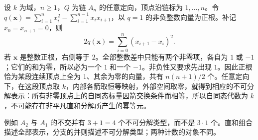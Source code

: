 \begin{example}\label{b5:exm:an-positive-roots}
	设 \(k\) 为域，\(n\geq1\)，\(Q\) 为链 \(A_n\) 的任意定向，顶点沿链标为 \(1,\ldots,n\)。令 \(q(\mathbf x)=\sum_{i=1}^n x_i^2-\sum_{i=1}^{n-1}x_ix_{i+1}\)，以 \(q=1\) 的非负整数向量为正根。补记 \(x_0=x_{n+1}=0\)，则
	\[
		2q(\mathbf x)=\sum_{i=0}^{n}(x_{i+1}-x_i)^2.
	\]
	若 \(\mathbf x\) 是整数正根，右侧等于 \(2\)。全部整数差中只能有两个非零项，各自为 \(1\) 或 \(-1\)；它们的和为零，所以必为一个 \(1\) 和一个 \(-1\)。非负性又要求先出现 \(1\)。因此正根恰为某段连续顶点上全为 \(1\)、其余为零的向量，共有 \(n(n+1)/2\) 个。任意定向下，在这段顶点取 \(k\)，内部各箭取恒等映射，外部空间取零，就得到相应的不可分解表示：所有非零顶点上的自同态标量因箭交换条件而相等，所以自同态代数为 \(k\)，不可能存在非平凡直和分解所产生的幂等元。
\end{example}

例如 \(A_2\) 与 \(A_1\) 的不交并有 \(3+1=4\) 个不可分解类型，而不是 \(3\cdot1\) 个。直和组合描述全部表示，分支的并则描述不可分解类型；两种计数的对象不同。
